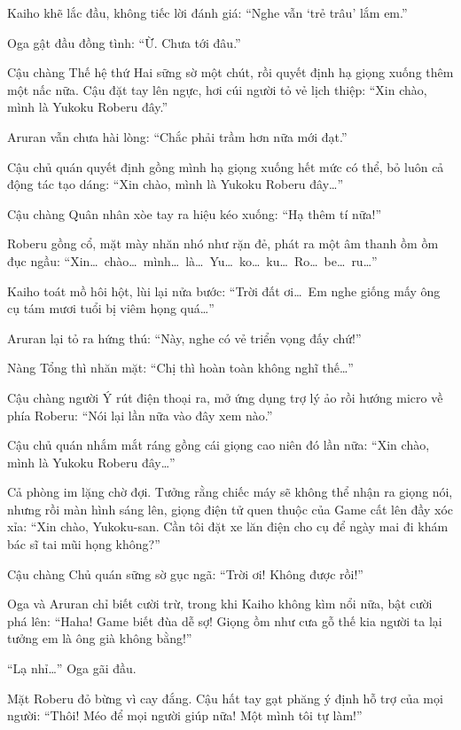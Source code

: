 \documentclass[../main.tex]{subfiles}
\begin{document}
Kaiho khẽ lắc đầu, không tiếc lời đánh giá: ``Nghe vẫn `trẻ trâu' lắm em.''

Oga gật đầu đồng tình: ``Ừ. Chưa tới đâu.''

Cậu chàng Thế hệ thứ Hai sững sờ một chút, rồi quyết định hạ giọng xuống thêm một nấc nữa. Cậu đặt tay lên ngực, hơi cúi người tỏ vẻ lịch thiệp: ``Xin chào, mình là Yukoku Roberu đây.''

Aruran vẫn chưa hài lòng: ``Chắc phải trầm hơn nữa mới đạt.''

Cậu chủ quán quyết định gồng mình hạ giọng xuống hết mức có thể, bỏ luôn cả động tác tạo dáng: ``Xin chào, mình là Yukoku Roberu đây\dots''

Cậu chàng Quân nhân xòe tay ra hiệu kéo xuống: ``Hạ thêm tí nữa!''

Roberu gồng cổ, mặt mày nhăn nhó như rặn đẻ, phát ra một âm thanh ồm ồm đục ngầu: ``Xin\dots\ chào\dots\ mình\dots\ là\dots\ Yu\dots\ ko\dots\ ku\dots\ Ro\dots\ be\dots\ ru\dots''

Kaiho toát mồ hôi hột, lùi lại nửa bước: ``Trời đất ơi\dots\ Em nghe giống mấy ông cụ tám mươi tuổi bị viêm họng quá\dots''

Aruran lại tỏ ra hứng thú: ``Này, nghe có vẻ triển vọng đấy chứ!''

Nàng Tổng thì nhăn mặt: ``Chị thì hoàn toàn không nghĩ thế\dots''

Cậu chàng người Ý rút điện thoại ra, mở ứng dụng trợ lý ảo rồi hướng micro về phía Roberu: ``Nói lại lần nữa vào đây xem nào.''


Cậu chủ quán nhắm mắt ráng gồng cái giọng cao niên đó lần nữa: ``Xin chào, mình là Yukoku Roberu đây\dots''

Cả phòng im lặng chờ đợi. Tưởng rằng chiếc máy sẽ không thể nhận ra giọng nói, nhưng rồi màn hình sáng lên, giọng điện tử quen thuộc của Game cất lên đầy xóc xỉa: ``Xin chào, Yukoku-san. Cần tôi đặt xe lăn điện cho cụ để ngày mai đi khám bác sĩ tai mũi họng không?''

Cậu chàng Chủ quán sững sờ gục ngã: ``Trời ơi! Không được rồi!''

Oga và Aruran chỉ biết cười trừ, trong khi Kaiho không kìm nổi nữa, bật cười phá lên: ``Haha! Game biết đùa dễ sợ! Giọng ồm như cưa gỗ thế kia người ta lại tưởng em là ông già không bằng!''

``Lạ nhỉ\dots'' Oga gãi đầu.

Mặt Roberu đỏ bừng vì cay đắng. Cậu hất tay gạt phăng ý định hỗ trợ của mọi người: ``Thôi! Méo để mọi người giúp nữa! Một mình tôi tự làm!''
\end{document}
